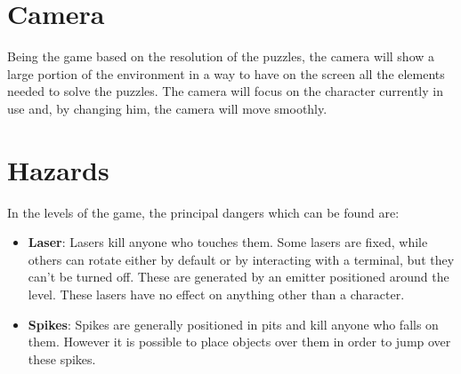 \documentclass[12pt, a4paper]{report}
\begin{document}
\section*{Camera}

Being the game based on the resolution of the puzzles, the camera will show a large portion of the environment in a way to have on the screen all the elements needed to solve the puzzles. The camera will focus on the character currently in use and, by changing him, the camera will move smoothly.

\section*{Hazards}
In the levels of the game, the principal dangers which can be found are:
\begin{itemize}
	\item \textbf{Laser}: Lasers kill anyone who touches them. Some lasers are fixed, while others can rotate either by default or by interacting with a 			terminal, but they can't be turned off. These are generated by an emitter positioned around the level. These lasers have no effect on anything other than a character.
	\item \textbf{Spikes}: Spikes are generally positioned in pits and kill anyone who falls on them. However it is possible to place objects over them in order to jump over these spikes.
\end{itemize}
\end{document}
